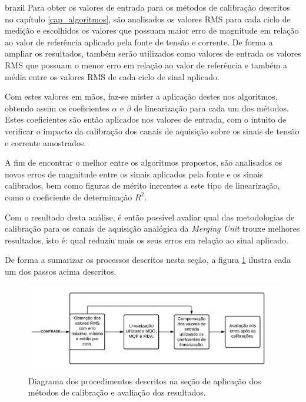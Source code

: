 \begin{otherlanguage*}{brazil}
Para obter os valores de entrada para os métodos de calibração  descritos no capítulo \ref{cap_algoritmos}, são analisados os valores RMS para cada ciclo de medição e escolhidos os valores que possuam maior erro de magnitude em relação ao valor de referência aplicado pela fonte de tensão e corrente. De forma a ampliar os resultados, também serão utilizados como valores de entrada os valores RMS que possuam o menor erro em relação ao valor de referência e também a média entre os valores RMS de cada ciclo de sinal aplicado.

Com estes valores em mãos, faz-se mister a aplicação destes nos algoritmos, obtendo assim os coeficientes $\alpha$ e $\beta$ de linearização para cada um dos métodos. Estes coeficientes são então aplicados nos valores de entrada, com o intuito de verificar o impacto da calibração dos canais de aquisição sobre os sinais de tensão e corrente amostrados.

A fim de encontrar o melhor entre os algoritmos propostos, são analisados os novos erros de magnitude entre os sinais aplicados pela fonte e os sinais calibrados, bem como figuras de mérito inerentes a este tipo de linearização, como o coeficiente de determinação $R^2$. 

Com o resultado desta análise, é então possível avaliar qual das metodologias de calibração para os canais de aquisição analógica da \textit{Merging Unit} trouxe melhores resultados, isto é: qual reduziu mais os seus erros em relação ao sinal aplicado.

De forma a sumarizar os processos descritos nesta seção, a figura \ref{fig:diag_met_aval} ilustra cada um dos passos acima descritos.

\begin{figure}[H]
    \centering
    \includegraphics[width=14cm]{pictures/diag_met_avalia.png}
    \caption{Diagrama dos procedimentos descritos na seção de aplicação dos métodos de calibração e avaliação dos resultados.}
    \label{fig:diag_met_aval}
\end{figure}

\end{otherlanguage*}


